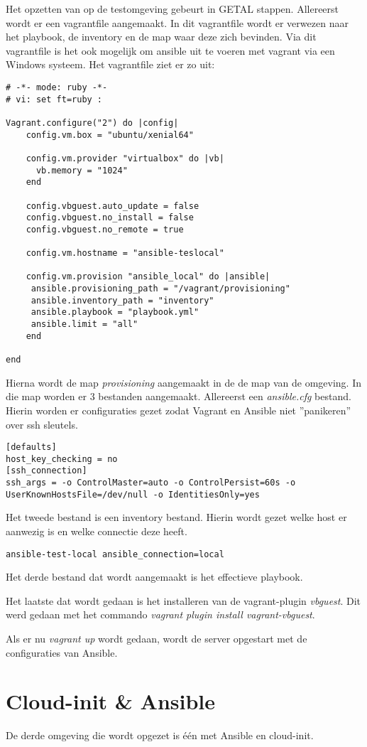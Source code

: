 Het opzetten van op de testomgeving gebeurt in GETAL stappen. Allereerst wordt er een vagrantfile aangemaakt. In dit vagrantfile wordt er verwezen naar het playbook, de inventory en de map waar deze zich bevinden. Via dit vagrantfile is het ook mogelijk om ansible uit te voeren met vagrant via een Windows systeem. Het vagrantfile ziet er zo uit:
\begin{lstlisting}
# -*- mode: ruby -*-
# vi: set ft=ruby :

Vagrant.configure("2") do |config|
    config.vm.box = "ubuntu/xenial64"
    
    config.vm.provider "virtualbox" do |vb|
      vb.memory = "1024"
    end
    
    config.vbguest.auto_update = false
    config.vbguest.no_install = false
    config.vbguest.no_remote = true
    
    config.vm.hostname = "ansible-teslocal"
    
    config.vm.provision "ansible_local" do |ansible|
     ansible.provisioning_path = "/vagrant/provisioning"
     ansible.inventory_path = "inventory"
     ansible.playbook = "playbook.yml"
     ansible.limit = "all"
    end

end
\end{lstlisting}

Hierna wordt de map \textit{provisioning} aangemaakt in de de map van de omgeving. In die map worden er 3 bestanden aangemaakt. Allereerst een \textit{ansible.cfg} bestand. Hierin worden er configuraties gezet zodat Vagrant en Ansible niet ''panikeren'' over ssh sleutels.
\begin{lstlisting}
[defaults]
host_key_checking = no
[ssh_connection]
ssh_args = -o ControlMaster=auto -o ControlPersist=60s -o UserKnownHostsFile=/dev/null -o IdentitiesOnly=yes
\end{lstlisting}
Het tweede bestand is een inventory bestand. Hierin wordt gezet welke host er aanwezig is en welke connectie deze heeft.
\begin{lstlisting}
ansible-test-local ansible_connection=local
\end{lstlisting}

Het derde bestand dat wordt aangemaakt is het effectieve playbook.

Het laatste dat wordt gedaan is het installeren van de vagrant-plugin \textit{vbguest}. Dit werd gedaan met het commando \textit{vagrant plugin install vagrant-vbguest}.

Als er nu \textit{vagrant up} wordt gedaan, wordt de server opgestart met de configuraties van Ansible.

\section{Cloud-init \& Ansible }
De derde omgeving die wordt opgezet is één met Ansible en cloud-init.